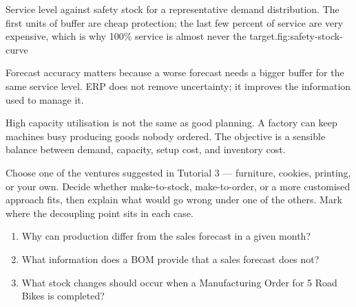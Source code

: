 \begin{utpfig}{Service level against safety
stock for a representative demand distribution. The first units of buffer are
cheap protection; the last few percent of service are very expensive, which is
why 100\% service is almost never the target.}{fig:safety-stock-curve}
\end{utpfig}

Forecast accuracy matters because a worse forecast needs a bigger buffer for the
same service level. ERP does not remove uncertainty; it improves the information
used to manage it.

\begin{pitfall}
High capacity utilisation is not the same as good planning. A factory can keep
machines busy producing goods nobody ordered. The objective is a sensible balance
between demand, capacity, setup cost, and inventory cost.
\end{pitfall}

\begin{tryit}
Choose one of the ventures suggested in Tutorial 3 --- furniture, cookies,
printing, or your own. Decide whether make-to-stock, make-to-order, or a more
customised approach fits, then explain what would go wrong under one of the
others. Mark where the decoupling point sits in each case.
\end{tryit}

\begin{quickcheck}
\begin{enumerate}
  \item Why can production differ from the sales forecast in a given month?
  \item What information does a BOM provide that a sales forecast does not?
  \item What stock changes should occur when a Manufacturing Order for 5 Road Bikes is completed?
\end{enumerate}
\end{quickcheck}
